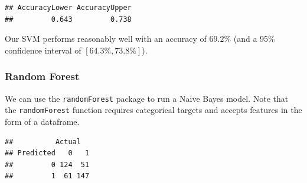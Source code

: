 \documentclass[12pt]{article}
\newenvironment{Shaded}{\begin{snugshade}}{\end{snugshade}}
\newcommand{\CommentTok}[1]{\textcolor[rgb]{0.56,0.35,0.01}{\textit{#1}}}
\newcommand{\DataTypeTok}[1]{\textcolor[rgb]{0.13,0.29,0.53}{#1}}
\newcommand{\DecValTok}[1]{\textcolor[rgb]{0.00,0.00,0.81}{#1}}
\newcommand{\KeywordTok}[1]{\textcolor[rgb]{0.13,0.29,0.53}{\textbf{#1}}}
\newcommand{\NormalTok}[1]{#1}
\newcommand{\OperatorTok}[1]{\textcolor[rgb]{0.81,0.36,0.00}{\textbf{#1}}}
\newcommand{\StringTok}[1]{\textcolor[rgb]{0.31,0.60,0.02}{#1}}
\begin{document}
\begin{verbatim}
## AccuracyLower AccuracyUpper 
##         0.643         0.738
\end{verbatim}

Our SVM performs reasonably well with an accuracy of \(69.2\%\) (and a
95\% confidence interval of \([64.3\%, 73.8\%]\)).

\hypertarget{random-forest}{%
\subsubsection{Random Forest}\label{random-forest}}

We can use the \texttt{randomForest} package to run a Naive Bayes model.
Note that the \texttt{randomForest} function requires categorical
targets and accepts features in the form of a dataframe.

\begin{Shaded}
\end{Shaded}

\begin{verbatim}
##          Actual
## Predicted   0   1
##         0 124  51
##         1  61 147
\end{verbatim}

\begin{Shaded}
\end{Shaded}
\end{document}
